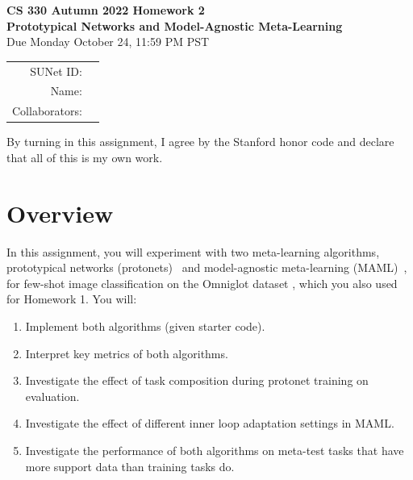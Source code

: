 \documentclass[12pt]{article}
\begin{document}
\begin{center}
{{\Large \textbf{CS 330 Autumn 2022 Homework 2 \\ Prototypical Networks and Model-Agnostic Meta-Learning}}
\\ {\large Due Monday October 24, 11:59 PM PST}}

\begin{tabular}{rl}
SUNet ID: &  \\
Name: & \\
Collaborators: & 
\end{tabular}
\end{center}

By turning in this assignment, I agree by the Stanford honor code and declare that all of this is my own work.

\section*{Overview}

In this assignment, you will experiment with two meta-learning algorithms, prototypical networks (protonets)~\cite{prototypical} and model-agnostic meta-learning (MAML)~\cite{maml}, for few-shot image classification on the Omniglot dataset \cite{Lake1332}, which you also used for Homework 1. You will:
\begin{enumerate}
    \item Implement both algorithms (given starter code).
    \item Interpret key metrics of both algorithms.
    \item Investigate the effect of task composition during protonet training on evaluation.
    \item Investigate the effect of different inner loop adaptation settings in MAML.
    \item Investigate the performance of both algorithms on meta-test tasks that have more support data than training tasks do.
\end{enumerate}
\end{document}
